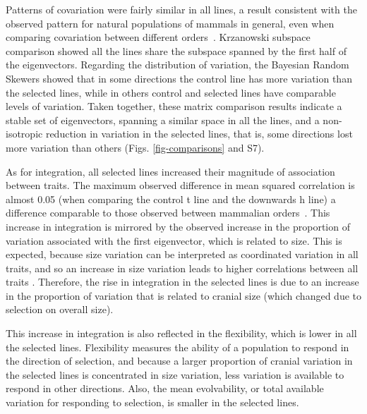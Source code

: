 \begin{refsection}
Patterns of covariation were fairly similar in all lines, a result
consistent with the observed pattern for natural populations of mammals
in general, even when comparing covariation between different
orders~\parencite{Porto2009-pi}. Krzanowski subspace comparison showed all the
lines share the subspace spanned by the first half of the eigenvectors.
Regarding the distribution of variation, the Bayesian Random Skewers
showed that in some directions the control line has more variation than
the selected lines, while in others control and selected lines have
comparable levels of variation. Taken together, these matrix comparison
results indicate a stable set of eigenvectors, spanning a similar space
in all the lines, and a non-isotropic reduction in variation in the
selected lines, that is, some directions lost more variation than others
(Figs. \ref{fig-comparisons} and S7).

As for integration, all selected lines increased their magnitude of
association between traits. The maximum observed difference in mean
squared correlation is almost 0.05 (when comparing the control t line
and the downwards h line) a difference comparable to those observed
between mammalian orders~\parencite{Marroig2009-gf}. This increase in
integration is mirrored by the observed increase in the proportion of
variation associated with the first eigenvector, which is related to
size. This is expected, because size variation can be interpreted as
coordinated variation in all traits, and so an increase in size
variation leads to higher correlations between all traits
\parencite{Porto2013-dc}. Therefore, the rise in integration in the selected
lines is due to an increase in the proportion of variation that is
related to cranial size (which changed due to selection on overall
size).

This increase in integration is also reflected in the flexibility, which
is lower in all the selected lines. Flexibility measures the ability of
a population to respond in the direction of selection, and because a
larger proportion of cranial variation in the selected lines is
concentrated in size variation, less variation is available to respond
in other directions. Also, the mean evolvability, or total available
variation for responding to selection, is smaller in the selected lines.


\end{refsection}
